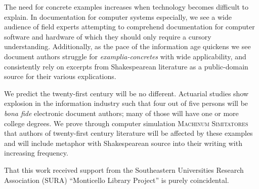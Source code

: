 \documentclass[12pt,dvips]{report}
\begin{document}
The need for concrete examples increases when technology becomes
difficult to explain.  In documentation for computer systems
especially, we see a wide audience of field experts attempting to
comprehend documentation for computer software and hardware of which
they should only require a cursory understanding.  Additionally, as
the pace of the information age quickens we see document authors
struggle for \textit{examplia-concretes} with wide applicability, and
consistently rely on excerpts from Shakespearean literature as a
public-domain source for their various explications.

We predict the twenty-first century will be no different.  Actuarial
studies show explosion in the information industry such that four out
of five persons will be \textit{bona fide} electronic document
authors; many of those will have one or more college degrees.  We
prove through computer simulation \textsc{Machinum Simitatores} that
authors of twenty-first century literature will be affected by these
examples and will include metaphor with Shakespearean source into
their writing with increasing frequency.

\vfill


That this work received support from the Southeastern Universities
Research Association (SURA) ``Monticello Library Project'' is purely
coincidental.

\pagebreak



\tableofcontents
\pagebreak

\listoffigures
\pagebreak

\listoftables
\pagebreak

\pagestyle{myheadings}












%


\end{document}
